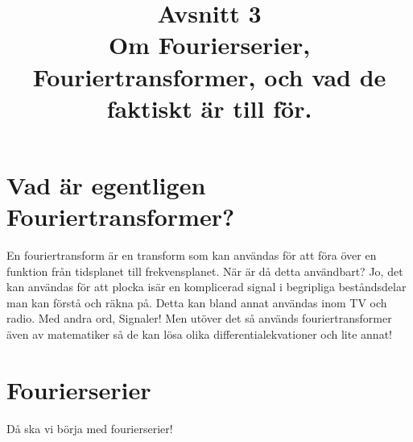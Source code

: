 \documentclass{article}
\title{Avsnitt 3 \\
\large Om Fourierserier, Fouriertransformer, och vad de faktiskt är till för.}
\author{ }
\date{}
\begin{document}
\maketitle

\section{Vad är egentligen Fouriertransformer?}
En fouriertransform är en transform som kan användas för att föra över en funktion från tidsplanet till frekvensplanet. När är då detta användbart? Jo, det kan användas för att plocka isär en komplicerad signal i begripliga beståndsdelar man kan förstå och räkna på. Detta kan bland annat användas inom TV och radio. Med andra ord, Signaler! Men utöver det så används fouriertransformer även av matematiker så de kan lösa olika differentialekvationer och lite annat!



\section{Fourierserier}

Då ska vi börja med fourierserier!
\end{document}

